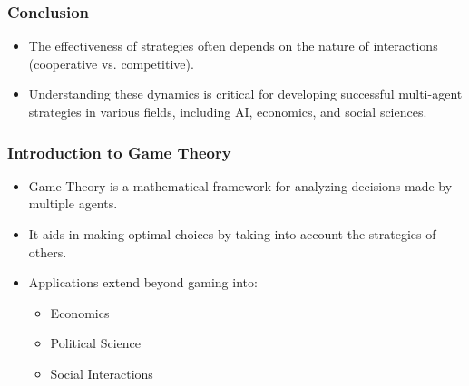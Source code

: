 \documentclass[aspectratio=169]{beamer}
\begin{document}
\begin{frame}[fragile]
    \frametitle{Conclusion}
    \begin{itemize}
        \item The effectiveness of strategies often depends on the nature of interactions (cooperative vs. competitive).
        \item Understanding these dynamics is critical for developing successful multi-agent strategies in various fields, including AI, economics, and social sciences.
    \end{itemize}
\end{frame}

\begin{frame}[fragile]
    \frametitle{Introduction to Game Theory}
    \begin{itemize}
        \item Game Theory is a mathematical framework for analyzing decisions made by multiple agents.
        \item It aids in making optimal choices by taking into account the strategies of others.
        \item Applications extend beyond gaming into:
        \begin{itemize}
            \item Economics
            \item Political Science
            \item Social Interactions
        \end{itemize}
    \end{itemize}
\end{frame}
\end{document}

